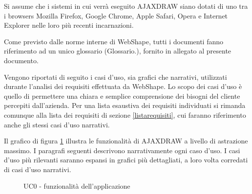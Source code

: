 Si assume che i sistemi in cui verr\`a eseguito AJAXDRAW siano dotati di uno tra i browsers Mozilla Firefox, Google Chrome, Apple Safari, Opera e Internet Explorer nelle loro pi\`u recenti incarnazioni.

Come previsto dalle norme interne di WebShape, tutti i documenti fanno riferimento ad un unico glossario (Glossario.), fornito in allegato al presente documento.

Vengono riportati di seguito i casi d'uso, sia grafici che narrativi, utilizzati durante l'analisi dei requisiti effettuata da WebShape. Lo scopo dei casi d'uso \`e quello di permettere una chiara e semplice comprensione dei bisogni del cliente percepiti dall'azienda. Per una lista esaustiva dei requisiti individuati si rimanda comunque alla lista dei requisiti di sezione \ref{listarequisiti}, cui faranno riferimento anche gli stessi casi d'uso narrativi.

Il grafico di figura \ref{uc0} illustra le funzionalit\`a di AJAXDRAW a livello di astrazione massimo. I paragrafi seguenti descrivono narrativamente ogni caso d'uso. I casi d'uso pi\`u rilevanti saranno espansi in grafici pi\`u dettagliati, a loro volta corredati di casi d'uso narrativi.

\begin{figure}[!ht]
\centering
\vspace{20pt} 
\caption{UC0 - funzionalit\`a dell'applicazione}
\label{uc0}
\end{figure}




